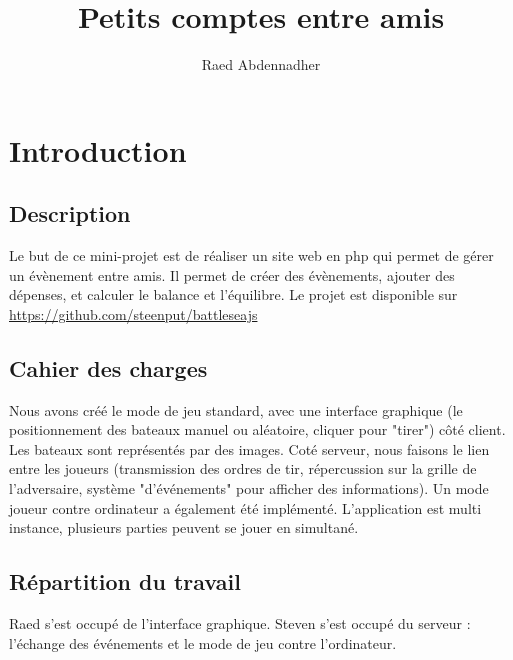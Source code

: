 \documentclass[a4paper, 11pt]{article}
\begin{document}
\title{Petits comptes entre amis} 
\author{Raed Abdennadher} 
\maketitle

\section{Introduction}
\subsection{Description}
Le but de ce mini-projet est de réaliser un site web en php qui permet de gérer un évènement entre amis. Il permet de créer des évènements, ajouter des dépenses, et calculer le balance et l'équilibre. Le projet est disponible sur \url{https://github.com/steenput/battleseajs}

\subsection{Cahier des charges}
Nous avons créé le mode de jeu standard, avec une interface graphique (le positionnement des bateaux manuel ou aléatoire, cliquer pour "tirer") côté client. Les bateaux sont représentés par des images. Coté serveur, nous faisons le lien entre les joueurs (transmission des ordres de tir, répercussion sur la grille de l’adversaire, système "d'événements" pour afficher des informations). Un mode joueur contre ordinateur a également été implémenté. L'application est multi instance, plusieurs parties peuvent se jouer en simultané.

\subsection{Répartition du travail}
Raed s'est occupé de l'interface graphique. Steven s'est occupé du serveur : l'échange des événements et le mode de jeu contre l'ordinateur.
\end{document}
